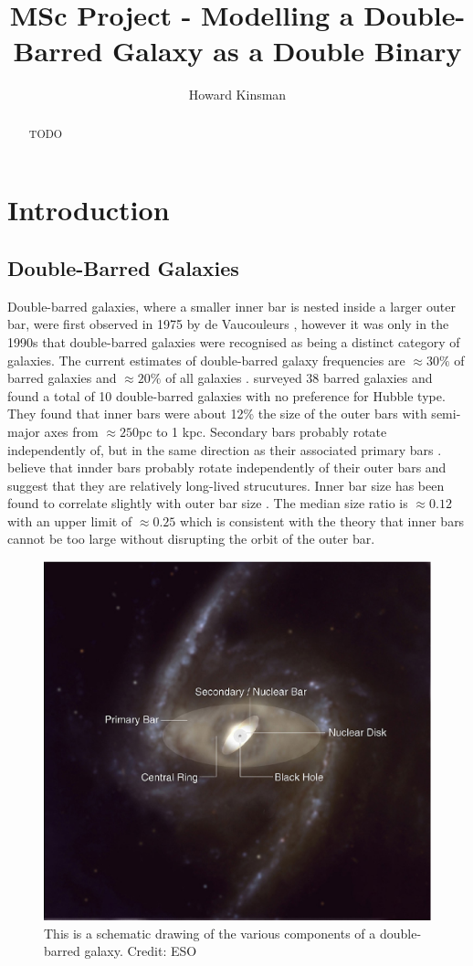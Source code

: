 \documentclass[a4paper,12pt]{article}
\author{Howard Kinsman}
\title{MSc Project - Modelling a Double-Barred Galaxy as a Double Binary}
\begin{document}
\maketitle
\begin{abstract}
TODO
\end{abstract}
\section{Introduction}
\subsection{Double-Barred Galaxies}
Double-barred galaxies, where a smaller inner bar is nested inside a larger outer bar, were first observed in 1975 by de Vaucouleurs \citep{vaucouleurs}, however it was only in the 1990s that double-barred galaxies
were recognised as being a distinct category of galaxies. The current estimates of double-barred galaxy frequencies are $\approx30\%$ of barred galaxies and $\approx20\%$ of all galaxies \citep{erwin3}.
\cite{erwin2} surveyed 38 barred galaxies and found a total of 10 double-barred galaxies with no preference for Hubble type. They found that inner bars were about 12\% the size of the outer bars with
semi-major axes from $\approx250$pc to 1 kpc. Secondary bars probably rotate independently of, but in the same direction as their associated primary bars \cite{erwin2}.
\cite{erwin1} believe that innder bars probably rotate independently of their outer bars and suggest that they are relatively long-lived strucutures.
Inner bar size has been found to correlate slightly with outer bar size \citep{erwin3}. The median size ratio is $\approx0.12$ with an upper limit of $\approx0.25$ which is consistent with the theory that
inner bars cannot be too large without disrupting the orbit of the outer bar.

\begin{figure}[H]
\centering
\includegraphics[width=.9\textwidth]{./eso0128d.eps}
\caption{This is a schematic drawing of the various components of a double-barred galaxy. Credit: ESO}
\label{fig:doublepic}
\end{figure}
\end{document}
